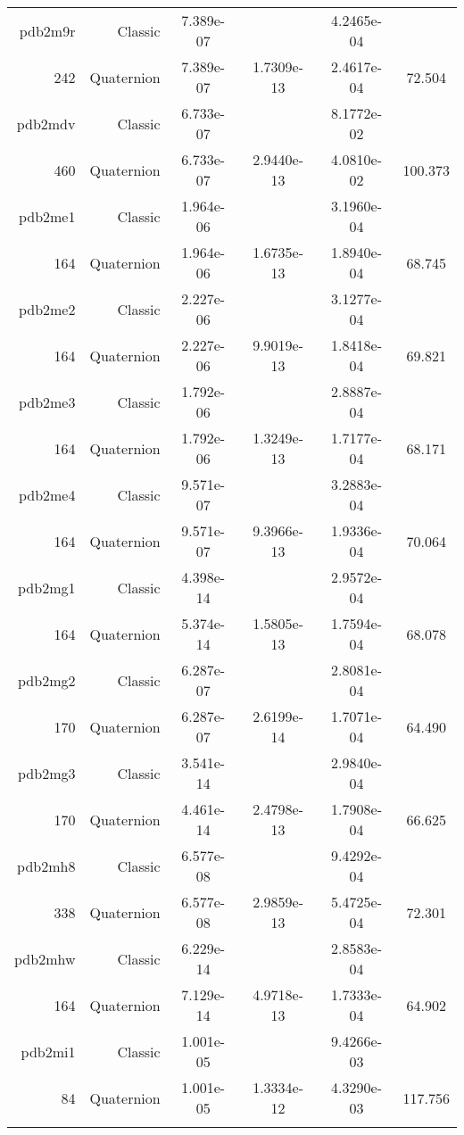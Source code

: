 \begin{xltabular}{\textwidth}{r|rS[table-format=1.3e+2]S[table-format=1.4e+2]S[table-format=1.4e+2]S[table-format=-1.3]}
pdb2m9r & Classic & 7.389e-07 &  & 4.2465e-04 & \\
242 & Quaternion & 7.389e-07 & 1.7309e-13 & 2.4617e-04 & 72.504\\  \addlinespace
pdb2mdv & Classic & 6.733e-07 &  & 8.1772e-02 & \\
460 & Quaternion & 6.733e-07 & 2.9440e-13 & 4.0810e-02 & 100.373\\  \addlinespace
pdb2me1 & Classic & 1.964e-06 &  & 3.1960e-04 & \\
164 & Quaternion & 1.964e-06 & 1.6735e-13 & 1.8940e-04 & 68.745\\  \addlinespace
pdb2me2 & Classic & 2.227e-06 &  & 3.1277e-04 & \\
164 & Quaternion & 2.227e-06 & 9.9019e-13 & 1.8418e-04 & 69.821\\  \addlinespace
pdb2me3 & Classic & 1.792e-06 &  & 2.8887e-04 & \\
164 & Quaternion & 1.792e-06 & 1.3249e-13 & 1.7177e-04 & 68.171\\  \addlinespace
pdb2me4 & Classic & 9.571e-07 &  & 3.2883e-04 & \\
164 & Quaternion & 9.571e-07 & 9.3966e-13 & 1.9336e-04 & 70.064\\  \addlinespace
pdb2mg1 & Classic & 4.398e-14 &  & 2.9572e-04 & \\
164 & Quaternion & 5.374e-14 & 1.5805e-13 & 1.7594e-04 & 68.078\\  \addlinespace
pdb2mg2 & Classic & 6.287e-07 &  & 2.8081e-04 & \\
170 & Quaternion & 6.287e-07 & 2.6199e-14 & 1.7071e-04 & 64.490\\  \addlinespace
pdb2mg3 & Classic & 3.541e-14 &  & 2.9840e-04 & \\
170 & Quaternion & 4.461e-14 & 2.4798e-13 & 1.7908e-04 & 66.625\\  \addlinespace
pdb2mh8 & Classic & 6.577e-08 &  & 9.4292e-04 & \\
338 & Quaternion & 6.577e-08 & 2.9859e-13 & 5.4725e-04 & 72.301\\  \addlinespace
pdb2mhw & Classic & 6.229e-14 &  & 2.8583e-04 & \\
164 & Quaternion & 7.129e-14 & 4.9718e-13 & 1.7333e-04 & 64.902\\  \addlinespace
pdb2mi1 & Classic & 1.001e-05 &  & 9.4266e-03 & \\
84 & Quaternion & 1.001e-05 & 1.3334e-12 & 4.3290e-03 & 117.756\\  \addlinespace

\end{xltabular}

